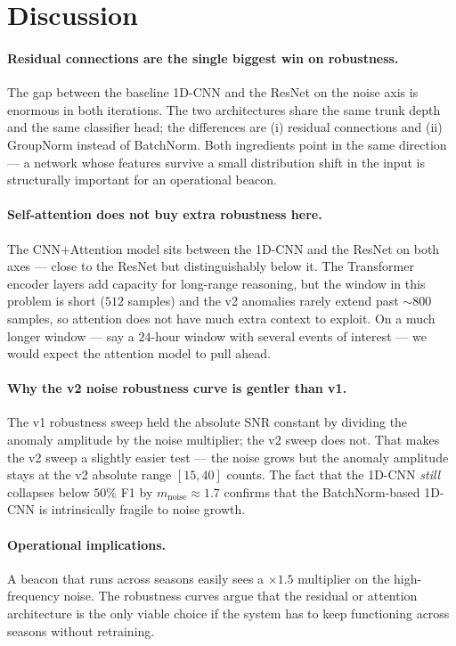 \section{Discussion}
\label{sec:rob-discuss}

\paragraph{Residual connections are the single biggest win on
robustness.} The gap between the baseline 1D-CNN and the ResNet on the
noise axis is enormous in both iterations. The two architectures share
the same trunk depth and the same classifier head; the differences are
(i) residual connections and (ii) GroupNorm instead of BatchNorm. Both
ingredients point in the same direction --- a network whose features
survive a small distribution shift in the input is structurally
important for an operational beacon.

\paragraph{Self-attention does not buy extra robustness here.} The
CNN+Attention model sits between the 1D-CNN and the ResNet on both
axes --- close to the ResNet but distinguishably below it. The
Transformer encoder layers add capacity for long-range reasoning, but
the window in this problem is short ($512$ samples) and the v2
anomalies rarely extend past $\sim 800$ samples, so attention does
not have much extra context to exploit. On a much longer window ---
say a $24$-hour window with several events of interest --- we would
expect the attention model to pull ahead.

\paragraph{Why the v2 noise robustness curve is gentler than v1.} The
v1 robustness sweep held the absolute SNR constant by dividing the
anomaly amplitude by the noise multiplier; the v2 sweep does not.
That makes the v2 sweep a slightly easier test --- the noise grows
but the anomaly amplitude stays at the v2 absolute range $[15, 40]$
counts. The fact that the 1D-CNN \emph{still} collapses below $50\%$
F1 by $m_{\text{noise}} \approx 1.7$ confirms that the BatchNorm-based
1D-CNN is intrinsically fragile to noise growth.

\paragraph{Operational implications.} A beacon that runs across
seasons easily sees a $\times 1.5$ multiplier on the high-frequency
noise. The robustness curves argue that the residual or attention
architecture is the only viable choice if the system has to keep
functioning across seasons without retraining.
